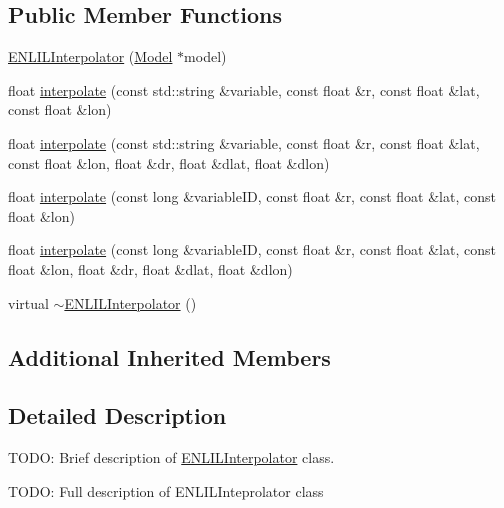 \subsection*{Public Member Functions}
\begin{DoxyCompactItemize}
\item 
\hyperlink{classccmc_1_1_e_n_l_i_l_interpolator_a923bb213a4816f5fd5d6dac6014061dd}{E\-N\-L\-I\-L\-Interpolator} (\hyperlink{classccmc_1_1_model}{Model} $\ast$model)
\item 
float \hyperlink{classccmc_1_1_e_n_l_i_l_interpolator_a6723169457825345162aa4a3af57841b}{interpolate} (const std\-::string \&variable, const float \&r, const float \&lat, const float \&lon)
\item 
float \hyperlink{classccmc_1_1_e_n_l_i_l_interpolator_ac786bd26509226558bc5c1147aef830b}{interpolate} (const std\-::string \&variable, const float \&r, const float \&lat, const float \&lon, float \&dr, float \&dlat, float \&dlon)
\item 
float \hyperlink{classccmc_1_1_e_n_l_i_l_interpolator_a57c5c56a524e42db6e0146fb0c9c8ae8}{interpolate} (const long \&variable\-I\-D, const float \&r, const float \&lat, const float \&lon)
\item 
float \hyperlink{classccmc_1_1_e_n_l_i_l_interpolator_a92508c6305deec651299b7e70ee3c531}{interpolate} (const long \&variable\-I\-D, const float \&r, const float \&lat, const float \&lon, float \&dr, float \&dlat, float \&dlon)
\item 
virtual \hyperlink{classccmc_1_1_e_n_l_i_l_interpolator_afb3fe1955829bc6c5aeda4ca22e5f5b9}{$\sim$\-E\-N\-L\-I\-L\-Interpolator} ()
\end{DoxyCompactItemize}
\subsection*{Additional Inherited Members}


\subsection{Detailed Description}
T\-O\-D\-O\-: Brief description of \hyperlink{classccmc_1_1_e_n_l_i_l_interpolator}{E\-N\-L\-I\-L\-Interpolator} class. 

T\-O\-D\-O\-: Full description of E\-N\-L\-I\-L\-Inteprolator class 


